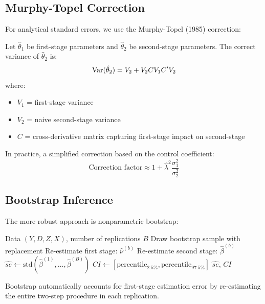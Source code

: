 \subsection{Murphy-Topel Correction}

For analytical standard errors, we use the Murphy-Topel (1985) correction:

\begin{theorem}
\label{thm:murphy_topel}
Let $\hat{\theta}_1$ be first-stage parameters and $\hat{\theta}_2$ be second-stage parameters. The correct variance of $\hat{\theta}_2$ is:
\[
\mathrm{Var}(\hat{\theta}_2) = V_2 + V_2 C V_1 C' V_2
\]
where:
\begin{itemize}
    \item $V_1$ = first-stage variance
    \item $V_2$ = naive second-stage variance
    \item $C$ = cross-derivative matrix capturing first-stage impact on second-stage
\end{itemize}
\end{theorem}

In practice, a simplified correction based on the control coefficient:
\[
\text{Correction factor} \approx 1 + \hat{\lambda}^2 \frac{\sigma^2_1}{\sigma^2_2}
\]

\subsection{Bootstrap Inference}

The more robust approach is nonparametric bootstrap:

\begin{algorithm}[htbp]
\caption{Bootstrap for Control Function}
\label{alg:cf_bootstrap}
\begin{algorithmic}[1]
\REQUIRE Data $(Y, D, Z, X)$, number of replications $B$
    \STATE Draw bootstrap sample with replacement
    \STATE Re-estimate first stage: $\hat{\nu}^{(b)}$
    \STATE Re-estimate second stage: $\hat{\beta}^{(b)}$
\ENDFOR
\STATE $\hat{se} \gets \text{std}(\hat{\beta}^{(1)}, \ldots, \hat{\beta}^{(B)})$
\STATE $CI \gets [\text{percentile}_{2.5\%}, \text{percentile}_{97.5\%}]$
\RETURN $\hat{se}$, $CI$
\end{algorithmic}
\end{algorithm}

\begin{remark}
Bootstrap automatically accounts for first-stage estimation error by re-estimating the entire two-step procedure in each replication.
\end{remark}


